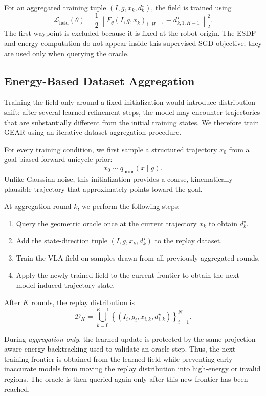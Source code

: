 \documentclass[letterpaper, 10 pt, conference]{ieeeconf}  %
\begin{document}
For an aggregated training tuple
$(I,g,x_k,d_k^\star)$, the field is trained using
\[
    \mathcal{L}_{\mathrm{field}}(\theta)
    =
    \frac{1}{2}
    \left\|
        F_\theta(I,g,x_k)_{1:H-1}
        -
        d_{k,1:H-1}^{\star}
    \right\|_2^2.
\]
The first waypoint is excluded because it is fixed at the robot origin.
The ESDF and energy computation do not appear inside this supervised SGD
objective; they are used only when querying the oracle.

\subsection{Energy-Based Dataset Aggregation}
\label{sec:aggregation}

Training the field only around a fixed initialization would introduce
distribution shift: after several learned refinement steps, the model may
encounter trajectories that are substantially different from the initial
training states. We therefore train GEAR using an iterative dataset
aggregation procedure.

For every training condition, we first sample a structured trajectory
$x_0$ from a goal-biased forward unicycle prior:
\[
    x_0
    \sim
    q_{\mathrm{prior}}(x\mid g).
\]
Unlike Gaussian noise, this initialization provides a coarse,
kinematically plausible trajectory that approximately points toward the goal.

At aggregation round $k$, we perform the following steps:
\begin{enumerate}
    \item Query the geometric oracle once at the current trajectory $x_k$ to
    obtain $d_k^\star$.
    \item Add the state-direction tuple
    $(I,g,x_k,d_k^\star)$ to the replay dataset.
    \item Train the VLA field on samples drawn from all previously aggregated
    rounds.
    \item Apply the newly trained field to the current frontier to obtain the
    next model-induced trajectory state.
\end{enumerate}

After $K$ rounds, the replay distribution is
\[
    \mathcal{D}_K
    =
    \bigcup_{k=0}^{K-1}
    \left\{
        (I_i,g_i,x_{i,k},d_{i,k}^\star)
    \right\}_{i=1}^{N}.
\]

During \emph{aggregation only}, the learned update is protected by the same
projection-aware energy backtracking used to validate an oracle step. Thus,
the next training frontier is obtained from the learned field while preventing
early inaccurate models from moving the replay distribution into
high-energy or invalid regions. The oracle is then queried again only after
this new frontier has been reached.
\end{document}
